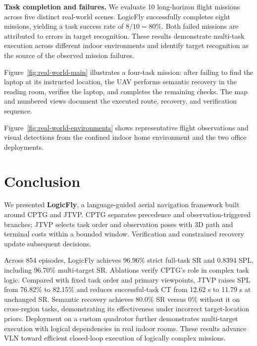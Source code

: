 \documentclass[letterpaper,10pt,journal]{IEEEtran}
\begin{document}
\textbf{Task completion and failures.}
We evaluate 10 long-horizon flight missions across five distinct real-world scenes. LogicFly successfully completes eight missions, yielding a task success rate of $8/10=80\%$. Both failed missions are attributed to errors in target recognition. These results demonstrate multi-task execution across different indoor environments and identify target recognition as the source of the observed mission failures.

Figure~\ref{fig:real-world-main} illustrates a four-task mission: after failing to find the laptop at its instructed location, the UAV performs semantic recovery in the reading room, verifies the laptop, and completes the remaining checks. The map and numbered views document the executed route, recovery, and verification sequence.

Figure~\ref{fig:real-world-environments} shows representative flight observations and visual detections from the confined indoor home environment and the two office deployments.



















\section{Conclusion}
We presented \textbf{LogicFly}, a language-guided aerial navigation framework built around CPTG and JTVP. CPTG separates precedence and observation-triggered branches; JTVP selects task order and observation poses with 3D path and terminal costs within a bounded window. Verification and constrained recovery update subsequent decisions.

Across 854 episodes, LogicFly achieves 96.96\% strict full-task SR and 0.8394 SPL, including 96.70\% multi-target SR. Ablations verify CPTG's role in complex task logic. Compared with fixed task order and primary viewpoints, JTVP raises SPL from 76.82\% to 82.15\% and reduces successful-task CT from 12.62 s to 11.79 s at unchanged SR. Semantic recovery achieves 80.0\% SR versus 0\% without it on cross-region tasks, demonstrating its effectiveness under incorrect target-location priors. Deployment on a custom quadrotor further demonstrates multi-target execution with logical dependencies in real indoor rooms. These results advance VLN toward efficient closed-loop execution of logically complex missions.


\end{document}
